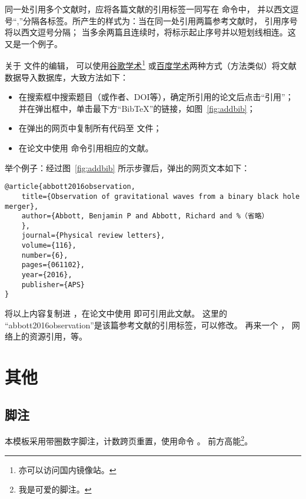 同一处引用多个文献时，应将各篇文献的引用标签一同写在  命令中，
并以西文逗号“,”分隔各标签。所产生的样式为：当在同一处引用两篇参考文献时，
引用序号将以西文逗号分隔；
当多余两篇且连续时，将标示起止序号并以短划线相连。这\cite{texbook,latexrumen}
又是\cite{texbook,latexrumen,gbt7714-2005}一个例子。\cite{abbott2016observation,texbook,latexrumen,buctthesis}

关于  文件的编辑，
可以使用\href{http://scholar.google.com.cn/}{谷歌学术}\footnote{亦可以访问国内镜像站。}%
或\href{http://xueshu.baidu.com}{百度学术}两种方式（方法类似）将文献数据导入\BibTeX{}数据库，大致方法如下：
\begin{itemize}
	\item 在搜索框中搜索题目（或作者、DOI等），确定所引用的论文后点击“引用”；并在弹出框中，单击最下方“BibTeX”的链接，如图~\ref{fig:addbib}；
	\item 在弹出的网页中复制所有代码至  文件；
	\item 在论文中使用  命令引用相应的文献。
\end{itemize}

举个例子：经过图~\ref{fig:addbib} 所示步骤后，弹出的网页文本如下：
\begin{lstlisting}
@article{abbott2016observation,
	title={Observation of gravitational waves from a binary black hole merger},
	author={Abbott, Benjamin P and Abbott, Richard and %（省略）
	},
	journal={Physical review letters},
	volume={116},
	number={6},
	pages={061102},
	year={2016},
	publisher={APS}
}
	\end{lstlisting}
将以上内容复制进 ，在论文中使用
即可引用此文献。
这里的 “abbott2016observation”是该篇参考文献的引用标签，可以修改。
再来一个\cite{ashirov2008tetramerization} ，
网络上的资源引用\cite{buctthesis}，等。

\section{其他}\label{sec:other}

\subsection{脚注}\label{subsec:footnote}
本模板采用带圈数字脚注，计数跨页重置，使用命令 。
前方高能\footnote{我是可爱的脚注。}。

